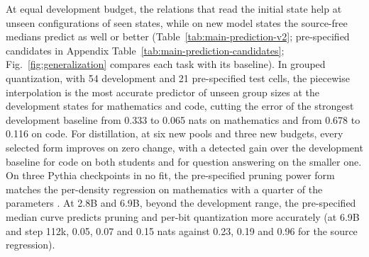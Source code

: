 At equal development budget, the relations that
read the initial state help at unseen configurations of seen states, while on new model states the
source-free medians predict as well or better (Table~\ref{tab:main-prediction-v2}; pre-specified candidates in Appendix
Table~\ref{tab:main-prediction-candidates}; Fig.~\ref{fig:generalization} compares each task with its
baseline). In grouped quantization, with 54
development and 21 pre-specified test cells, the piecewise interpolation is the most accurate
predictor of unseen group sizes at the development states for mathematics and code, cutting the error
of the strongest development baseline from 0.333 to 0.065 nats on mathematics and from 0.678 to 0.116
on code. For distillation,
at six new pools and three new budgets, every selected form improves on zero change, with a detected
gain over the development baseline for code on both students and for question answering on the
smaller one. On three Pythia checkpoints in no fit, the pre-specified pruning power form matches the per-density regression on mathematics with a quarter of the parameters . At 2.8B and 6.9B, beyond the development range, the
pre-specified median curve predicts pruning and per-bit quantization more accurately (at 6.9B and step 112k,
0.05, 0.07 and 0.15 nats against 0.23, 0.19 and 0.96 for the source regression).
